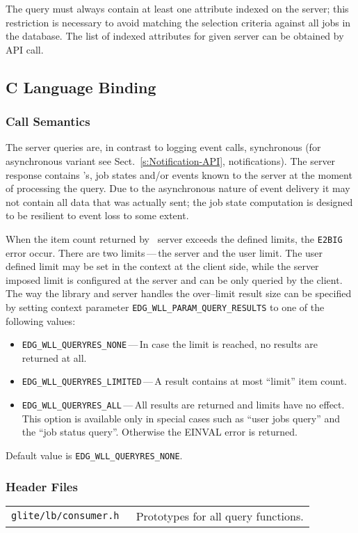 %
The query must always contain at least one attribute indexed
on the \LB server; this restriction is necessary to avoid matching the
selection criteria against all jobs in the \LB database. The list of
indexed attributes for given \LB server can be obtained by \LB API
call.

\subsection{C Language Binding}

\subsubsection{Call Semantics}
The \LB server queries are, in contrast to logging event calls,
synchronous (for asynchronous variant see Sect.~\ref{s:Notification-API},
notifications). The server response contains \jobid's, job states
and/or events known to the server at the moment of processing the
query. Due to the asynchronous nature of event delivery it may not
contain all data that was actually sent; the job state computation is
designed to be resilient to event loss to some extent.

%
When the item count returned by \LB\ server exceeds the defined
limits, the \verb'E2BIG' error occur. There are two limits\,---\,the server
and the user limit. The user defined limit may be set in the context
at the client side, while the server imposed limit is configured at
the server and can be only queried by the client. The way the \LB
library and server handles the over--limit result size can be
specified by setting context parameter
\verb'EDG_WLL_PARAM_QUERY_RESULTS' to one of the following values:
\begin{itemize}
\item \verb'EDG_WLL_QUERYRES_NONE'\,---\,In case the limit is reached,
no results are returned at all.
\item \verb'EDG_WLL_QUERYRES_LIMITED'\,---\,A result contains at most
``limit'' item count.
\item \verb'EDG_WLL_QUERYRES_ALL'\,---\,All results are returned and
limits have no effect. This option is available only in special cases
such as ``user jobs query'' and  the ``job status query''. Otherwise
the EINVAL error is returned.
\end{itemize}
Default value is \verb'EDG_WLL_QUERYRES_NONE'.


\subsubsection{Header Files}
\begin{table}[h!]
\begin{tabularx}{\textwidth}{>{\tt}lX}
glite/lb/consumer.h & Prototypes for all query functions. \\
\end{tabularx}
\end{table}

